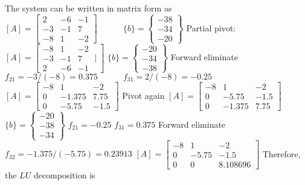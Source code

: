 \documentclass[../main.tex]{subfiles}
\begin{document}
\section{}
The system can be written in matrix form as
\bigbreak
$[A]=\left[\begin{array}{ccc}
2 & -6 & -1 \\
-3 & -1 & 7 \\
-8 & 1 & -2
\end{array}\right] \quad\quad\quad\{b\}=\left\{\begin{array}{c}
-38 \\
-34 \\
-20
\end{array}\right\}$
\bigbreak
Partial pivot:
\bigbreak
$[A]=\left[\begin{array}{ccc}-8 & 1 & -2 \\ -3 & -1 & 7 \\ 2 & -6 & -1\end{array} \mid\right]$\quad\quad\quad\quad
$\{b\}=\left\{\begin{array}{l}-20 \\ -34 \\ -38\end{array}\right\}$
\bigbreak
Forward eliminate
\bigbreak
$f_{21}=-3 /(-8)=0.375 \quad\quad\quad f_{31}=2 /(-8)=-0.25$
\bigbreak
$[A]=\left[\begin{array}{ccc}-8 & 1 & -2 \\ 0 & -1.375 & 7.75 \\ 0 & -5.75 & -1.5\end{array}\right]$
\bigbreak
Pivot again
\bigbreak
$[A]=\left[\begin{array}{ccc}-8 & 1 & -2 \\ 0 & -5.75 & -1.5 \\ 0 & -1.375 & 7.75\end{array}\right]$\quad\quad\quad
$\{b\}=\left\{\begin{array}{l}-20 \\ -38 \\ -34\end{array}\right\}$\bigbreak
$f_{21}=-0.25$\quad\quad\quad
$f_{31}=0.375$
\bigbreak
Forward eliminate
\bigbreak
$f_{32}=-1.375 /(-5.75)=0.23913$
\bigbreak
$[A]=\left[\begin{array}{ccc}-8 & 1 & -2 \\ 0 & -5.75 & -1.5 \\ 0 & 0 & 8.108696\end{array}\right]$
\bigbreak
Therefore, the $L U$ decomposition is
\bigbreak
\end{document}
